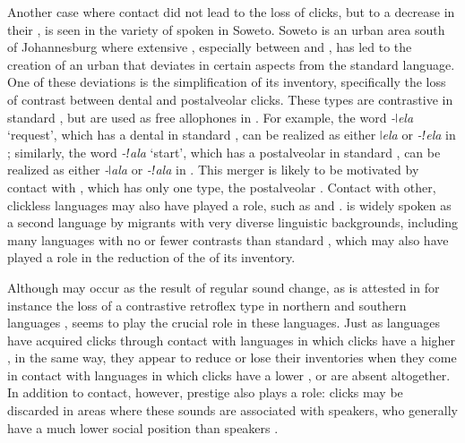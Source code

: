 \documentclass[output=paper
,newtxmath
,modfonts
,nonflat]{langsci/langscibook}
\begin{document}
Another case where contact did not lead to the loss of clicks, but to a decrease in their , is seen in the variety of  spoken in Soweto. Soweto is an urban area south of Johannesburg where extensive , especially between  and , has led to the creation of an urban  that deviates in certain aspects from the standard language. One of these deviations is the simplification of its  inventory, specifically the loss of contrast between dental and postalveolar clicks. These  types are contrastive in standard , but are used as free allophones in . For example, the word \textit{-ǀela} ‘request’, which has a dental  in standard , can be realized as either \textit{\-ǀela} or \textit{-ǃela} in ; similarly, the word \textit{-ǃala} ‘start’, which has a postalveolar  in standard , can be realized as either \textit{-ǀala} or \textit{-ǃala} in  \citep[164-165]{Gunnink2014}. This merger is likely to be motivated by contact with , which has only one  type, the postalveolar . Contact with other, clickless  languages may also have played a role, such as  and .  is widely spoken as a second language by migrants with very diverse linguistic backgrounds, including many languages with no or fewer  contrasts than standard , which may also have played a role in the reduction of the  of its  inventory.

Although  may occur as the result of regular sound change, as is attested in for instance the loss of a contrastive retroflex  type in northern and southern  languages \citep[cf.][]{Sands2010},  seems to play the crucial role in these  languages. Just as  languages have acquired clicks through contact with languages in which clicks have a higher , in the same way, they appear to reduce or lose their  inventories when they come in contact with languages in which clicks have a lower , or are absent altogether. In addition to contact, however, prestige also plays a role: clicks may be discarded in areas where these sounds are associated with  speakers, who generally have a much lower social position than  speakers \citep{Wilmsen1990}. 
\end{document}
